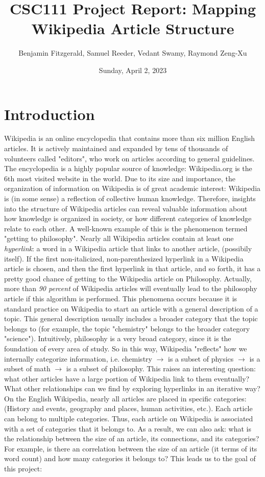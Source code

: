 \documentclass[fontsize=11pt]{article}
\title{CSC111 Project Report: Mapping Wikipedia Article Structure}
\author{Benjamin Fitzgerald, Samuel Reeder, Vedant Swamy, Raymond Zeng-Xu}
\date{Sunday, April 2, 2023}
\begin{document}
    \maketitle

    \section*{Introduction}

    Wikipedia is an online encyclopedia that contains more than six million English articles. It is actively maintained and expanded by tens of thousands of volunteers called "editors", who work on articles according to general guidelines. The encyclopedia is a highly popular source of knowledge: Wikipedia.org is the 6th most visited website in the world. Due to its size and importance, the organization of information on Wikipedia is of great academic interest: Wikipedia is (in some sense) a reflection of collective human knowledge. Therefore, insights into the structure of Wikipedia articles can reveal valuable information about how knowledge is organized in society, or how different categories of knowledge relate to each other. A well-known example of this is the phenomenon termed "getting to philosophy". Nearly all Wikipedia articles contain at least one \textit{hyperlink}: a word in a Wikipedia article that links to another article, (possibily itself). If the first non-italicized, non-parenthesized hyperlink in a Wikipedia article is chosen, and then the first hyperlink in that article, and so forth, it has a pretty good chance of getting to the Wikipedia article on Philosophy. Actually, more than \textit{90 percent} of Wikipedia articles will eventually lead to the philosophy article if this algorithm is performed. This phenomena occurs because it is standard practice on Wikipedia to start an article with a general description of a topic. This general description usually includes a broader category that the topic belongs to (for example, the topic "chemistry" belongs to the broader category "science"). Intuitively, philosophy is a very broad category, since it is the foundation of every area of study. So in this way, Wikipedia "reflects" how we internally categorize information, i.e. chemistry $\rightarrow$ is a subset of physics $\rightarrow$ is a subset of math $\rightarrow$ is a subset of philosophy. This raises an interesting question: what other articles have a large portion of Wikipedia link to them eventually? What other relationships can we find by exploring hyperlinks in an iterative way? On the English Wikipedia, nearly all articles are placed in specific categories: (History and events, geography and places, human activities, etc.). Each article can belong to multiple categories. Thus, each article on Wikipedia is associated with a set of categories that it belongs to. As a result, we can also ask: what is the relationship between the size of an article, its connections, and its categories? For example, is there an correlation between the size of an article (it terms of its word count) and how many categories it belongs to? This leads us to the goal of this project:
\end{document}
